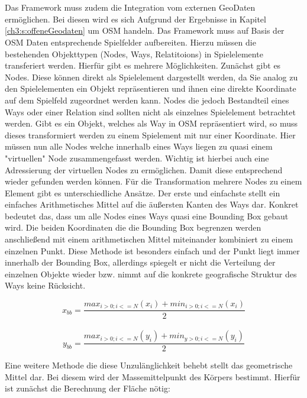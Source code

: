\\\\
Das Framework muss zudem die Integration vom externen GeoDaten ermöglichen. Bei diesen wird es sich Aufgrund der Ergebnisse in Kapitel \ref{ch3:s:offeneGeodaten} um OSM handeln. Das Framework muss auf Basis der OSM Daten entsprechende Spielfelder aufbereiten. Hierzu müssen die bestehenden Objekttypen (Nodes, Ways, Relatitoions) in Spielelemente transferiert werden. Hierfür gibt es mehrere Möglichkeiten.
Zunächst gibt es Nodes. Diese können direkt als Spielelement dargestellt werden, da Sie analog zu den Spielelementen ein Objekt repräsentieren und ihnen eine direkte Koordinate auf dem Spielfeld zugeordnet werden kann. Nodes die jedoch Bestandteil eines Ways oder einer Relation sind sollten nicht als einzelnes Spielelement betrachtet werden.
Gibt es ein Objekt, welches als Way in OSM repräsentiert wird, so muss dieses transformiert werden zu einem Spielement mit nur einer Koordinate. Hier müssen nun alle Nodes welche innerhalb eines Ways liegen zu quasi einem "virtuellen" Node zusammengefasst werden.
Wichtig ist hierbei auch eine Adressierung der virtuellen Nodes zu ermöglichen. Damit diese entsprechend wieder gefunden werden können.
Für die Transformation mehrere Nodes zu einem Element gibt es unterschiedliche Ansätze. Der erste und einfachste stellt ein einfaches Arithmetisches Mittel auf die äußersten Kanten des Ways dar. Konkret bedeutet das, dass um alle Nodes eines Ways quasi eine Bounding Box gebaut wird. Die beiden Koordinaten die die Bounding Box begrenzen werden anschließend mit einem arithmetischen Mittel miteinander kombiniert zu einem einzelnen Punkt. Diese Methode ist besonders einfach und der Punkt liegt immer innerhalb der Bounding Box, allerdings spiegelt er nicht die Verteilung der einzelnen Objekte wieder bzw. nimmt auf die konkrete geografische Struktur des Ways keine Rücksicht.

\begin{equation}
x_{bb} = \frac{max_{i>0; i<=N}(x_i) + min_{i>0; i<=N}(x_i)}{2}
\end{equation}
\\
\begin{equation}
y_{bb} = \frac{max_{i>0; i<=N}(y_i) + min_{y>0; i<=N}(y_i)}{2}
\end{equation}

Eine weitere Methode die diese Unzulänglichkeit behebt stellt das geometrische Mittel dar.
Bei diesem wird der Massemittelpunkt des Körpers bestimmt. Hierfür ist zunächst die Berechnung der Fläche nötig:

